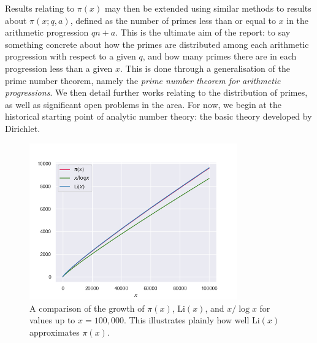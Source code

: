 Results relating to $\pi(x)$ may then be extended using similar methods to results about $\pi(x; q, a)$, defined as the number of primes less than or equal to $x$ in the arithmetic progression $q n + a$. This is the ultimate aim of the report: to say something concrete about how the primes are distributed among each arithmetic progression with respect to a given $q$, and how many primes there are in each progression less than a given $x$. This is done through a generalisation of the prime number theorem, namely the \textit{prime number theorem for arithmetic progressions}. We then detail further works relating to the distribution of primes, as well as significant open problems in the area. For now, we begin at the historical starting point of analytic number theory: the basic theory developed by Dirichlet.
\begin{figure}
    \centering
    \includegraphics[width=0.8\textwidth]{Chapter1/growth_rates.png}
    \caption[A comparison of the growth of $\pi(x)$, $\textrm{Li}(x)$, and $x/\log x$ for values up to $x = 100,000$. This illustrates plainly how well $\textrm{Li}(x)$ approximates $\pi(x)$.]{A comparison of the growth of $\pi(x)$, $\textrm{Li}(x)$, and $x/\log x$ for values up to $x = 100,000$. This illustrates plainly how well $\textrm{Li}(x)$ approximates $\pi(x)$. \protect\footnotemark}
    \label{fig:my_label}
\end{figure}
